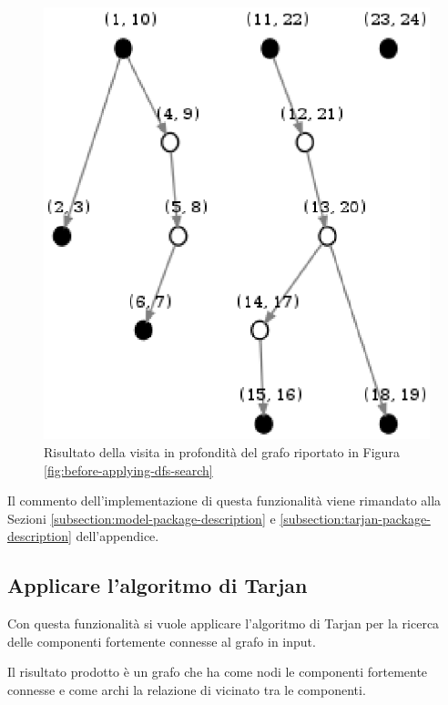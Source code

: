 \begin{figure}
  \centering
  \includegraphics{images/OnePipingLevelUnitTest_Printer_DFS_PrinterPipe_Papadimitriou-phase-PrinterPipeFilter-level-2.eps}
  \caption{Risultato della visita in profondit\`a del grafo riportato
    in Figura \ref{fig:before-applying-dfs-search}}
  \label{fig:dfs-forest}
\end{figure}

Il commento dell'implementazione di questa funzionalit\`a viene
rimandato alla Sezioni \ref{subsection:model-package-description} e
\ref{subsection:tarjan-package-description} dell'appendice.

\subsection{Applicare l'algoritmo di Tarjan}
\label{subsection:use-case-tarjan}
Con questa funzionalit\`a si vuole applicare l'algoritmo di Tarjan per
la ricerca delle componenti fortemente connesse al grafo in input.

Il risultato prodotto \`e un grafo che ha come nodi le componenti
fortemente connesse e come archi la relazione di vicinato tra le
componenti.

